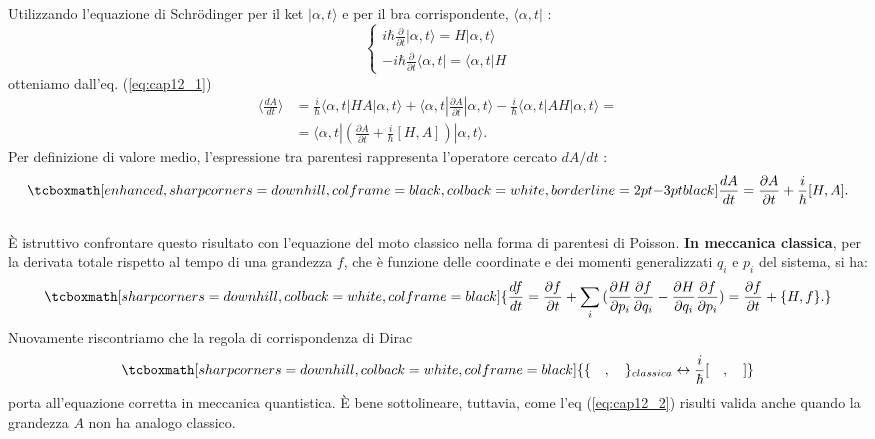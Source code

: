 Utilizzando l'equazione di Schr\"{o}dinger per il ket $|\alpha,t\rangle$ e per il bra corrispondente,   $\langle\alpha,t|$ :
	\begin{equation}
		\begin{cases}
		\displaystyle{i\hbar\frac{\partial }{\partial{t}}|\alpha,t\rangle= H|\alpha,t\rangle }\\[0.3cm]
	\displaystyle{-i\hbar\frac{\partial }{\partial{t}}\langle\alpha,t|= \langle\alpha,t|H } 
		\end{cases}
	\end{equation}
otteniamo dall'eq. (\ref{eq:cap12_1})
	\begin{align}
		\langle\frac{dA}{dt} \rangle &= \frac{i}{\hbar} \langle\alpha,t|HA|\alpha,t\rangle + \langle \alpha,t|\frac{\partial A}{\partial{t}}|\alpha,t \rangle -\frac{i}{\hbar} \langle \alpha,t|AH|\alpha,t\rangle=  \nonumber\\
		&= \langle \alpha,t| (\frac{\partial A}{\partial{t}} + \frac{i}{\hbar}[H,A] ) |\alpha,t\rangle .
	\end{align}
Per definizione di valore medio, l'espressione tra parentesi rappresenta l'operatore cercato $dA/dt$ :
	\begin{equation}
	\label{eq:cap12_2}
		\tcboxmath[enhanced, sharp corners=downhill, colframe=black, colback=white, borderline={2pt}{-3pt}{black}]{
			\frac{dA}{dt}= \frac{\partial A}{\partial{t}}+ \frac{i}{\hbar}[H,A].
			}
	\end{equation}\\

È istruttivo confrontare questo risultato con l'equazione del moto classico nella forma di parentesi di Poisson. \textbf{In meccanica classica}, per la derivata totale rispetto al tempo di una grandezza $f$, che è funzione delle coordinate e dei momenti generalizzati $q_i$ e $p_i$ del sistema, si ha:
	\begin{equation}
		\tcboxmath[sharp corners=downhill, colback=white, colframe=black]{
			\frac{df}{dt}= \frac{\partial f}{\partial{t}} + \sum_{i}^{}{(\frac{\partial H}{\partial{p_i}}\frac{\partial f}{\partial{q_i}} - \frac{\partial H}{\partial{q_i}}\frac{\partial f}{\partial{p_i}}} )=
\frac{\partial f}{\partial{t}}+ \{H,f\}.
			}
	\end{equation}
Nuovamente riscontriamo che la regola di corrispondenza di Dirac 
	\begin{equation}
		\tcboxmath[sharp corners=downhill, colback=white, colframe=black]{
			\{ \quad,\quad   \}_{classica}  \leftrightarrow \frac{i}{\hbar} [ \quad, \quad]
			}
	\end{equation}
porta all'equazione corretta in meccanica quantistica. È bene sottolineare, tuttavia, come l'eq (\ref{eq:cap12_2}) risulti valida anche quando la grandezza $A$ non ha analogo classico.\\


